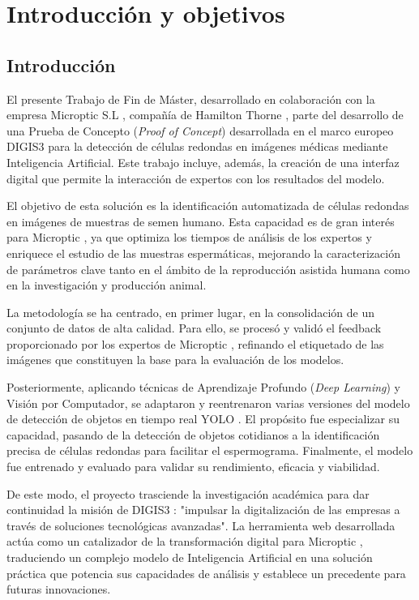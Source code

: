 \documentclass[12pt,a4paper,onecolumn,oneside]{report}
\begin{document}
\chapter{Introducción y objetivos} %
\label{Introducción y objetivos}
\section{Introducción}
\label{sec:Introducción}

El presente Trabajo de Fin de Máster, desarrollado en colaboración con la empresa Microptic S.L \cite{microptic}, compañía de Hamilton Thorne \cite{HamiltonThorneWeb}, 
parte del desarrollo de una Prueba de Concepto (\textit{Proof of Concept}) desarrollada en el marco europeo DIGIS3 \cite{digis3} para la detección de células redondas en imágenes médicas 
mediante Inteligencia Artificial. Este trabajo incluye, además, la creación de una interfaz digital que permite la interacción de expertos 
con los resultados del modelo.

El objetivo de esta solución es la identificación automatizada de células redondas en imágenes de muestras de semen humano. Esta capacidad es de 
gran interés para Microptic \cite{microptic}, ya que optimiza los tiempos de análisis de los expertos y enriquece el estudio de las muestras espermáticas, 
mejorando la caracterización de parámetros clave tanto en el ámbito de la reproducción asistida humana como en la investigación y producción animal. 

La metodología se ha centrado, en primer lugar, en la consolidación de un conjunto de datos de alta calidad. Para ello, se procesó y validó el feedback 
proporcionado por los expertos de Microptic \cite{microptic}, refinando el etiquetado de las imágenes que constituyen la base para la evaluación de los modelos.

Posteriormente, aplicando técnicas de Aprendizaje Profundo (\textit{Deep Learning}) y Visión por Computador, se adaptaron y reentrenaron varias versiones 
del modelo de detección de objetos en tiempo real YOLO \cite{ultralytics_models}. El propósito fue especializar su capacidad, pasando de la detección de objetos 
cotidianos a la identificación precisa de células redondas para facilitar el espermograma. Finalmente, el modelo fue entrenado y evaluado 
para validar su rendimiento, eficacia y viabilidad.

De este modo, el proyecto trasciende la investigación académica para dar continuidad la misión de DIGIS3 \cite{digis3}: "impulsar la digitalización de las empresas a través 
de soluciones tecnológicas avanzadas". La herramienta web desarrollada actúa como un catalizador de la transformación digital para Microptic \cite{microptic}, traduciendo 
un complejo modelo de Inteligencia Artificial en una solución práctica que potencia sus capacidades de análisis y establece un precedente para futuras innovaciones.
\end{document}
